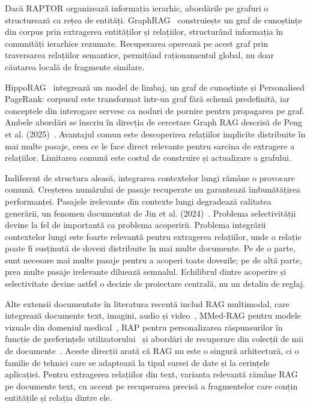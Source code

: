 Dacă RAPTOR organizează informația ierarhic, abordările pe grafuri o structurează ca rețea de entități. GraphRAG~\cite{edge2024graphrag} construiește un graf de cunoștințe din corpus prin extragerea entităților și relațiilor, structurând informația în comunități ierarhice rezumate. Recuperarea operează pe acest graf prin traversarea relațiilor semantice, permițând raționamentul global, nu doar căutarea locală de fragmente similare.

HippoRAG~\cite{gutierrez2024hipporag} integrează un model de limbaj, un graf de cunoștințe și Personalised PageRank: corpusul este transformat într-un graf fără schemă predefinită, iar conceptele din interogare servesc ca noduri de pornire pentru propagarea pe graf. Ambele abordări se înscriu în direcția de cercetare Graph RAG descrisă de Peng et al. (2025)~\cite{peng2025graph}. Avantajul comun este descoperirea relațiilor implicite distribuite în mai multe pasaje, ceea ce le face direct relevante pentru sarcina de extragere a relațiilor. Limitarea comună este costul de construire și actualizare a grafului.

Indiferent de structura aleasă, integrarea contextelor lungi rămâne o provocare comună. Creșterea numărului de pasaje recuperate nu garantează îmbunătățirea performanței. Pasajele irelevante din contexte lungi degradează calitatea generării, un fenomen documentat de Jin et al. (2024)~\cite{jin2024long}. Problema selectivității devine la fel de importantă ca problema acoperirii. Problema integrării contextelor lungi este foarte relevantă pentru extragerea relațiilor, unde o relație poate fi susținută de dovezi distribuite în mai multe documente. Pe de o parte, sunt necesare mai multe pasaje pentru a acoperi toate dovezile; pe de altă parte, prea multe pasaje irelevante diluează semnalul. Echilibrul dintre acoperire și selectivitate devine astfel o decizie de proiectare centrală, nu un detaliu de reglaj.

Alte extensii documentate în literatura recentă includ RAG multimodal, care integrează documente text, imagini, audio și video~\cite{mei2025survey}, MMed-RAG pentru modele vizuale din domeniul medical~\cite{xia2024mmed}, RAP pentru personalizarea răspunsurilor în funcție de preferințele utilizatorului~\cite{hao2025rap} și abordări de recuperare din colecții de mii de documente~\cite{chen2025document}. Aceste direcții arată că RAG nu este o singură arhitectură, ci o familie de tehnici care se adaptează la tipul sursei de date și la cerințele aplicației. Pentru extragerea relațiilor din text, varianta relevantă rămâne RAG pe documente text, cu accent pe recuperarea precisă a fragmentelor care conțin entitățile și relația dintre ele.


